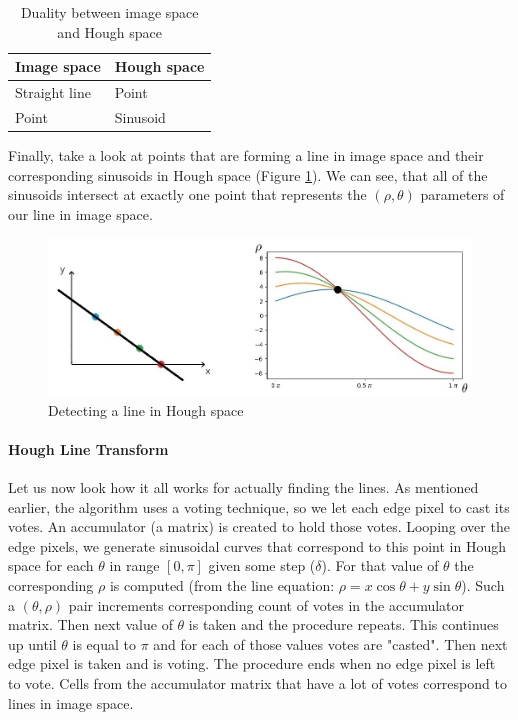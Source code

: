\begin{table}[H]
	\centering
	\begin{tabular}{|l|l|}
		\hline
		\textbf{Image space} & \textbf{Hough space} \\ [0.5ex]
		\hline
		Straight line & Point \\ [0.5ex]
		\hline
		Point & Sinusoid \\ [0.5ex]
		\hline
	\end{tabular}
	\caption{Duality between image space and Hough space}
\end{table}
Finally, take a look at points that are forming a line in image space and their corresponding sinusoids in Hough space (Figure \ref{fig:line_detection_in_hough_space}). We can see, that all of the sinusoids intersect at exactly one point that represents the $(\rho, \theta)$ parameters of our line in image space.
\begin{figure}[H]
	\centering
	\includegraphics[width=\textwidth]{images/points_to_sinusoids}
	\caption{Detecting a line in Hough space}
	\label{fig:line_detection_in_hough_space}
\end{figure}

\paragraph{Hough Line Transform}
Let us now look how it all works for actually finding the lines. As mentioned earlier, the algorithm uses a voting technique, so we let each edge pixel to cast its votes. An accumulator (a matrix) is created to hold those votes. Looping over the edge pixels, we generate sinusoidal curves that correspond to this point in Hough space for each $\theta$ in range $[0, \pi]$ given some step ($\delta$). For that value of $\theta$ the corresponding $\rho$ is computed (from the line equation: $\rho = x\cos\theta + y\sin\theta$). Such a $(\theta, \rho)$ pair increments corresponding count of votes in the accumulator matrix. Then next value of $\theta$ is taken and the procedure repeats. This continues up until $\theta$ is equal to $\pi$  and for each of those values votes are "casted". Then next edge pixel is taken and is voting. The procedure ends when no edge pixel is left to vote. Cells from the accumulator matrix that have a lot of votes correspond to lines in image space.

